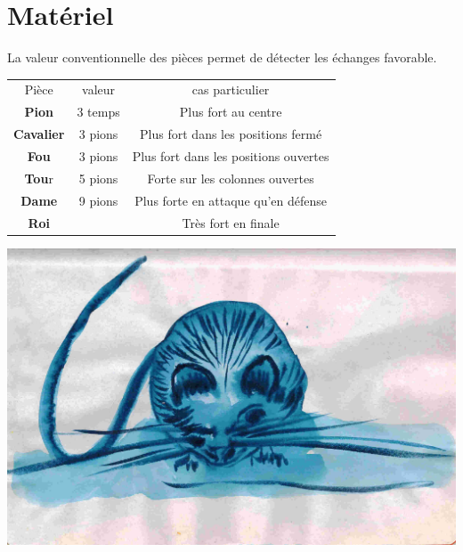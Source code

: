 
\chapter{Matériel}


La valeur conventionnelle des pièces permet de détecter les échanges favorable.

\begin{center}
\begin{tabular}{ccc}
Pièce & valeur & cas particulier \\
{\bf Pion} & 3 temps & Plus fort au centre \\
{\bf Cavalier} & 3 pions & Plus fort dans les positions fermé \\
{\bf Fou} & 3 pions & Plus fort dans les positions ouvertes\\
{\bf Tou}r & 5 pions & Forte sur les colonnes ouvertes \\
{\bf Dame} & 9 pions & Plus forte en attaque qu'en défense\\
{\bf Roi} &  & Très fort en finale\\
\end{tabular}
\end{center}

\vfill

\begin{center}
\includegraphics[scale=.5]{./image/souris10}
\end{center}

\vfill


